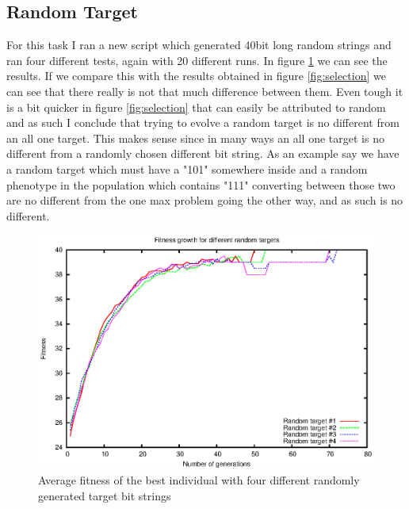 \subsection{Random Target}\label{sec:random target}
For this task I ran a new script which generated 40bit long random strings and
ran four different tests, again with 20 different runs. In figure
\ref{fig:random target} we can see the results. If we compare this with the
results obtained in figure \ref{fig:selection} we can see that there really is
not that much difference between them. Even tough it is a bit quicker in figure
\ref{fig:selection} that can easily be attributed to random and as such I
conclude that trying to evolve a random target is no different from an all one
target. This makes sense since in many ways an all one target is no different
from a randomly chosen different bit string. As an example say we have a random
target which must have a "101" somewhere inside and a random phenotype in the
population which contains "111" converting between those two are no different from the
one max problem going the other way, and as such is no different.

\begin{figure}[h!]
	\includegraphics{../graphs/fitness_target_average.eps}
	\caption{Average fitness of the best individual with four different
	randomly generated target bit strings}
	\label{fig:random target}
\end{figure}
